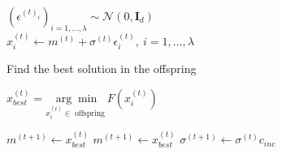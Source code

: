 \documentclass{book}
\begin{document}
\begin{itemize}
\begin{algorithm}[]
\begin{algorithmic}[1]
{            \vspace{0.2em}
            \begin{center}
                $(\epsilon^{(t)_i})_{i=1,\dots,\lambda} \sim \mathcal{N}(0, \mathbf{I}_d)$ \\
                $x^{(t)}_i \gets m^{(t)} + \sigma^{(t)}\epsilon^{(t)}_i, \ i=1,\dots,\lambda$
            \end{center}
            }
            \STATE Find the best solution in the offspring
            \begin{center}
                $x_{best}^{(t)}=\underset{x_{i}^{(t)}\in \operatorname{offspring}}{\arg\min}F(x_i^{(t)})$
            \end{center}
                \STATE $m^{(t+1)}\gets x_{best}^{(t)}$
                \STATE $m^{(t+1)}\gets x_{best}^{(t)}$
                \STATE $\sigma^{(t+1)}\gets \sigma^{(t)}c_{inc}$


\end{algorithmic}
\end{algorithm}
\end{itemize}
\end{document}
